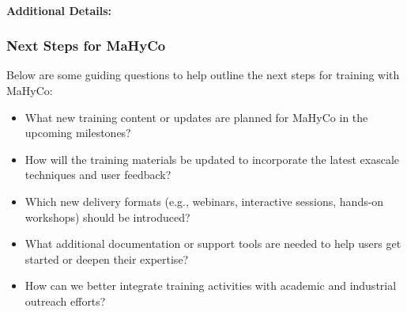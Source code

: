 \paragraph{Additional Details:}


\subsubsection{Next Steps for MaHyCo}
\label{sec:MaHyCo:next-steps}

Below are some guiding questions to help outline the next steps for training with MaHyCo:
\begin{itemize}
    \item What new training content or updates are planned for MaHyCo in the upcoming milestones?
    \item How will the training materials be updated to incorporate the latest exascale techniques and user feedback?
    \item Which new delivery formats (e.g., webinars, interactive sessions, hands-on workshops) should be introduced?
    \item What additional documentation or support tools are needed to help users get started or deepen their expertise?
    \item How can we better integrate training activities with academic and industrial outreach efforts?
\end{itemize}